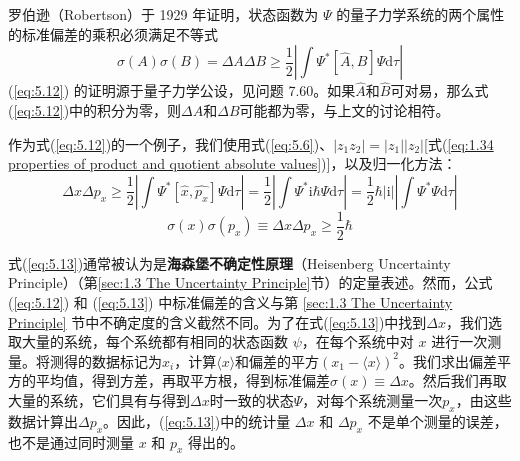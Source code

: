     罗伯逊（Robertson）于 1929 年证明，状态函数为 $\Psi$ 的量子力学系统的两个属性的标准偏差的乘积必须满足不等式
    \begin{equation}
        \sigma\left(A\right)\sigma\left(B\right) = \Delta A \Delta B \ge \frac{1}{2}\left|\int \Psi^{\ast}\left[\hat{A},\hat{B}\right]\Psi\mathrm{d}\tau\right|
        \label{eq:5.12}
    \end{equation}
    (\ref{eq:5.12}) 的证明源于量子力学公设，见问题 7.60。如果$\hat{A}$和$\hat{B}$可对易，那么式(\ref{eq:5.12})中的积分为零，则$\Delta A$和$\Delta B$可能都为零，与上文的讨论相符。

    作为式(\ref{eq:5.12})的一个例子，我们使用式(\ref{eq:5.6})、$\left|z_1z_2\right|=\left|z_1\right|\left|z_2\right|$[式(\ref{eq:1.34 properties of product and quotient absolute values})]，以及归一化方法：
    \begin{equation*}
        \Delta x \Delta p_x \ge \frac{1}{2}\left|\int \Psi^{\ast}\left[\hat{x},\hat{p_x}\right]\Psi\mathrm{d}\tau\right| = \frac{1}{2}\left|\int \Psi^{\ast}\mathrm{i}\hbar\Psi\mathrm{d}\tau\right| = \frac{1}{2}\hbar\left|\mathrm{i}\right|\left|\int \Psi^{\ast}\Psi\mathrm{d}\tau\right|
    \end{equation*}
    \begin{equation}
        \sigma\left(x\right)\sigma\left(p_x\right) \equiv \Delta x \Delta p_x \ge \frac{1}{2}\hbar
        \label{eq:5.13}
    \end{equation}

    式(\ref{eq:5.13})通常被认为是\textbf{海森堡不确定性原理}（Heisenberg Uncertainty Principle）（第\ref{sec:1.3 The Uncertainty Principle}节）的定量表述。然而，公式 (\ref{eq:5.12}) 和 (\ref{eq:5.13}) 中标准偏差的含义与第 \ref{sec:1.3 The Uncertainty Principle} 节中不确定度的含义截然不同。为了在式(\ref{eq:5.13})中找到$\Delta x$，我们选取大量的系统，每个系统都有相同的状态函数 $\psi$，在每个系统中对 $x$ 进行一次测量。将测得的数据标记为$x_i$，计算$\langle x \rangle$和偏差的平方$\left(x_1-\langle x \rangle\right)^2$。我们求出偏差平方的平均值，得到方差，再取平方根，得到标准偏差$\sigma\left(x\right)\equiv \Delta x$。然后我们再取大量的系统，它们具有与得到$\Delta x$时一致的状态$\Psi$，对每个系统测量一次$p_x$，由这些数据计算出$\Delta p_x$。因此，(\ref{eq:5.13})中的统计量 $\Delta x$ 和 $\Delta p_x$ 不是单个测量的误差，也不是通过同时测量 $x$ 和 $p_x$ 得出的。


